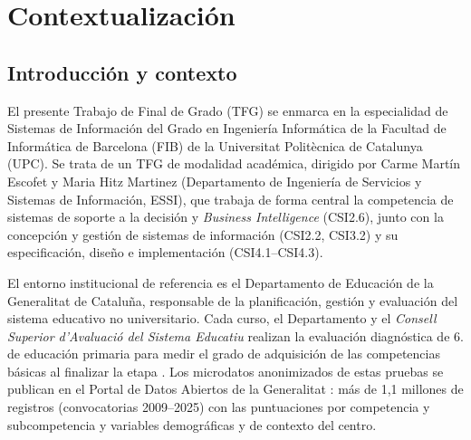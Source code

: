 \documentclass[12pt, a4paper, oneside]{report}
\begin{document}
\chapter{Contextualización}

\section{Introducción y contexto}
El presente Trabajo de Final de Grado (TFG) se enmarca en la especialidad de Sistemas de Información del Grado en Ingeniería Informática de la Facultad de Informática de Barcelona (FIB) de la Universitat Politècnica de Catalunya (UPC). Se trata de un TFG de modalidad académica, dirigido por Carme Martín Escofet y Maria Hitz Martinez (Departamento de Ingeniería de Servicios y Sistemas de Información, ESSI), que trabaja de forma central la competencia de sistemas de soporte a la decisión y \textit{Business Intelligence} (CSI2.6), junto con la concepción y gestión de sistemas de información (CSI2.2, CSI3.2) y su especificación, diseño e implementación (CSI4.1--CSI4.3).

El entorno institucional de referencia es el Departamento de Educación de la Generalitat de Cataluña, responsable de la planificación, gestión y evaluación del sistema educativo no universitario. Cada curso, el Departamento y el \textit{Consell Superior d'Avaluació del Sistema Educatiu} realizan la evaluación diagnóstica de 6.\textordmasculine{} de educación primaria para medir el grado de adquisición de las competencias básicas al finalizar la etapa \cite{csase_resultats}. Los microdatos anonimizados de estas pruebas se publican en el Portal de Datos Abiertos de la Generalitat \cite{transparencia_catalunya_2024}: más de 1,1 millones de registros (convocatorias 2009--2025) con las puntuaciones por competencia y subcompetencia y variables demográficas y de contexto del centro.
\end{document}
